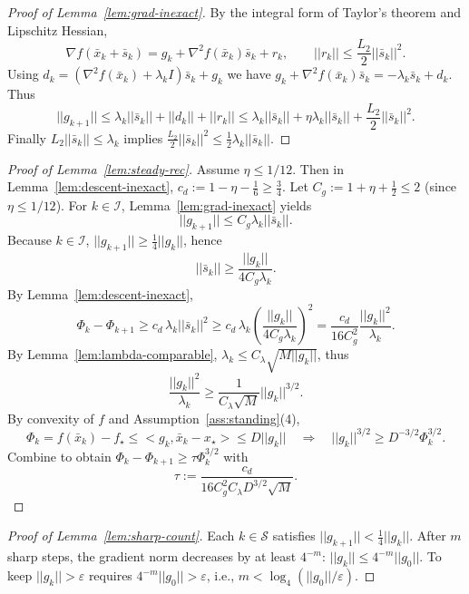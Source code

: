 \documentclass[11pt,a4paper]{article}
\def\norm#1{||#1||}%
\def\ip#1#2{<#1,#2>}%
\newcommand{\ip}[2]{\left\langle #1,#2\right\rangle}
\newcommand{\norm}[1]{\left\|#1\right\|}
\begin{document}
	\begin{proof}[Proof of Lemma~\ref{lem:grad-inexact}]
		By the integral form of Taylor's theorem and Lipschitz Hessian,
		\[
		\nabla f(\bar x_k+\bar s_k)=g_k+\nabla^2 f(\bar x_k)\bar s_k+r_k,\qquad \norm{r_k}\le \frac{L_2}{2}\norm{\bar s_k}^2.
		\]
		Using $d_k=(\nabla^2 f(\bar x_k)+\lambda_k I)\bar s_k+g_k$ we have
		$g_k+\nabla^2 f(\bar x_k)\bar s_k=-\lambda_k\bar s_k+d_k$.
		Thus
		\[
		\norm{g_{k+1}}\le \lambda_k\norm{\bar s_k}+\norm{d_k}+\norm{r_k}
		\le \lambda_k\norm{\bar s_k}+\eta\lambda_k\norm{\bar s_k}+\frac{L_2}{2}\norm{\bar s_k}^2.
		\]
		Finally $L_2\norm{\bar s_k}\le \lambda_k$ implies $\frac{L_2}{2}\norm{\bar s_k}^2\le \frac12\lambda_k\norm{\bar s_k}$.
	\end{proof}
	
	\begin{proof}[Proof of Lemma~\ref{lem:steady-rec}]
		Assume $\eta\le 1/12$. Then in Lemma~\ref{lem:descent-inexact},
		$c_d:=1-\eta-\frac16\ge \frac34$.
		Let $C_g:=1+\eta+\frac12\le 2$ (since $\eta\le 1/12$).
		For $k\in\mathcal I$, Lemma~\ref{lem:grad-inexact} yields
		\[
		\norm{g_{k+1}}\le C_g\lambda_k\norm{\bar s_k}.
		\]
		Because $k\in\mathcal I$, $\norm{g_{k+1}}\ge \frac14\norm{g_k}$, hence
		\[
		\norm{\bar s_k}\ge \frac{\norm{g_k}}{4C_g\lambda_k}.
		\]
		By Lemma~\ref{lem:descent-inexact},
		\[
		\Phi_k-\Phi_{k+1}\ge c_d\,\lambda_k\norm{\bar s_k}^2
		\ge c_d\,\lambda_k\left(\frac{\norm{g_k}}{4C_g\lambda_k}\right)^2
		=\frac{c_d}{16C_g^2}\frac{\norm{g_k}^2}{\lambda_k}.
		\]
		By Lemma~\ref{lem:lambda-comparable}, $\lambda_k\le C_\lambda\sqrt{M\norm{g_k}}$,
		thus
		\[
		\frac{\norm{g_k}^2}{\lambda_k}\ge \frac{1}{C_\lambda\sqrt{M}}\norm{g_k}^{3/2}.
		\]
		By convexity of $f$ and Assumption~\ref{ass:standing}(4),
		\[
		\Phi_k=f(\bar x_k)-f_\star \le \ip{g_k}{\bar x_k-x_\star}\le D\norm{g_k}
		\quad\Rightarrow\quad
		\norm{g_k}^{3/2}\ge D^{-3/2}\Phi_k^{3/2}.
		\]
		Combine to obtain $\Phi_k-\Phi_{k+1}\ge \tau \Phi_k^{3/2}$ with
		\[
		\tau:=\frac{c_d}{16C_g^2 C_\lambda D^{3/2}\sqrt{M}}.
		\]
	\end{proof}
	
	\begin{proof}[Proof of Lemma~\ref{lem:sharp-count}]
		Each $k\in\mathcal S$ satisfies $\norm{g_{k+1}}<\frac14\norm{g_k}$.
		After $m$ sharp steps, the gradient norm decreases by at least $4^{-m}$:
		$\norm{g_{k}}\le 4^{-m}\norm{g_0}$.
		To keep $\norm{g_k}>\varepsilon$ requires $4^{-m}\norm{g_0}>\varepsilon$, i.e., $m<\log_4(\norm{g_0}/\varepsilon)$.
	\end{proof}
	
\end{document}
